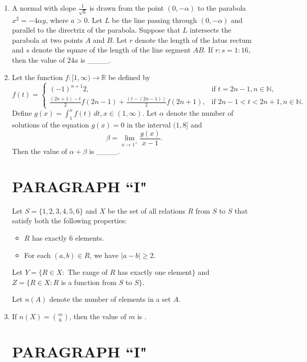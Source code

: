 \documentclass[12pt,a4paper]{article}
\begin{document}
\begin{enumerate}
    \item A normal with slope $ \frac{1}{\sqrt{6}} $ is drawn from the point $ (0,-\alpha) $ to the parabola $ x^2 = -4\alpha y $, where $ a > 0 $. Let $ L $ be the line passing through $ (0,-\alpha) $ and parallel to the directrix of the parabola. Suppose that $ L $ intersects the parabola at two points $ A $ and $ B $. Let $ r $ denote the length of the latus rectum and $ s $ denote the square of the length of the line segment $ AB $. If $ r:s = 1:16 $, then the value of $ 24a $ is \_\_\_\_.

    \item Let the function $ f : [1, \infty) \to \mathbb{R} $ be defined by  
\[
    f(t) =
    \begin{cases} 
    (-1)^{n+1} 2, & \text{if } t = 2n - 1, n \in \mathbb{N}, \\ 
    \frac{(2n+1)-t}{2} f(2n-1) + \frac{(t - (2n-1))}{2} f(2n+1), & \text{if } 2n - 1 < t < 2n + 1, n \in \mathbb{N}.
    \end{cases}
\]
    Define $ g(x) = \int_1^x f(t) \, dt, x \in (1, \infty) $. Let $ \alpha $ denote the number of solutions of the equation $ g(x) = 0 $ in the interval $ (1,8] $ and  
\[
    \beta = \lim\limits_{x \to 1^+} \frac{g(x)}{x-1}.
\]
    Then the value of $ \alpha + \beta $ is \_\_\_\_.

\section*{PARAGRAPH ``I"}

Let $S = \{1,2,3,4,5,6\}$ and $X$ be the set of all relations $R$ from $S$ to $S$ that satisfy both the following properties:

\begin{itemize}
    \item $R$ has exactly 6 elements.
    \item For each $(a,b) \in R$, we have $|a - b| \geq 2$.
\end{itemize}

Let $Y = \{ R \in X :$ The range of $R$ has exactly one element$\}$ and  
$Z = \{ R \in X : R$ is a function from $S$ to $S\}$.  

Let $n(A)$ denote the number of elements in a set $A$.

\item If $n(X) = \binom{m}{6}$, then the value of $m$ is \underline{\hspace{1cm}}.

\section*{PARAGRAPH ``I"}


\end{enumerate}
\end{document}

